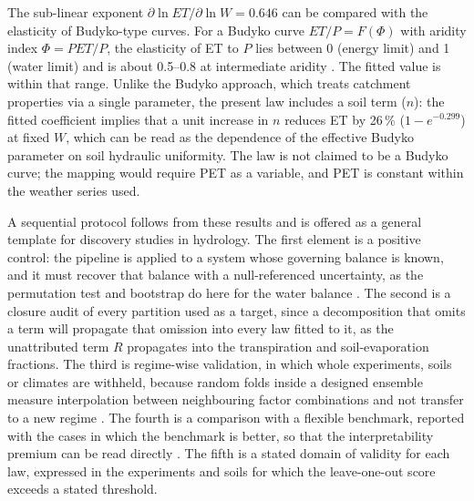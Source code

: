 \documentclass[preprint,12pt,authoryear]{elsarticle}
\begin{document}
The sub-linear exponent $\partial\ln\mathit{ET}/\partial\ln W=0.646$ can be compared with the elasticity of Budyko-type curves. For a Budyko curve $\mathit{ET}/P=F(\Phi)$ with aridity index $\Phi=\mathit{PET}/P$, the elasticity of ET to $P$ lies between 0 (energy limit) and 1 (water limit) and is about 0.5--0.8 at intermediate aridity \citep{Milly1994,Zhang2001,Budyko1974}. The fitted value is within that range. Unlike the Budyko approach, which treats catchment properties via a single parameter, the present law includes a soil term ($n$): the fitted coefficient implies that a unit increase in $n$ reduces ET by 26\,\% ($1-e^{-0.299}$) at fixed $W$, which can be read as the dependence of the effective Budyko parameter on soil hydraulic uniformity. The law is not claimed to be a Budyko curve; the mapping would require PET as a variable, and PET is constant within the weather series used.


A sequential protocol follows from these results and is offered as a general template for discovery studies in hydrology. The first element is a positive control: the pipeline is applied to a system whose governing balance is known, and it must recover that balance with a null-referenced uncertainty, as the permutation test and bootstrap do here for the water balance \citep{Efron1993,Good2005}. The second is a closure audit of every partition used as a target, since a decomposition that omits a term will propagate that omission into every law fitted to it, as the unattributed term $R$ propagates into the transpiration and soil-evaporation fractions. The third is regime-wise validation, in which whole experiments, soils or climates are withheld, because random folds inside a designed ensemble measure interpolation between neighbouring factor combinations and not transfer to a new regime \citep{Roberts2017}. The fourth is a comparison with a flexible benchmark, reported with the cases in which the benchmark is better, so that the interpretability premium can be read directly \citep{Rudin2019,Friedman2001}. The fifth is a stated domain of validity for each law, expressed in the experiments and soils for which the leave-one-out score exceeds a stated threshold.
\end{document}
